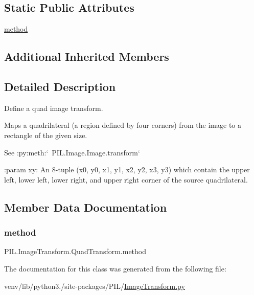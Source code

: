 \subsection*{Static Public Attributes}
\begin{DoxyCompactItemize}
\item 
\hyperlink{classPIL_1_1ImageTransform_1_1QuadTransform_aae86a5010e638667d2da9af44c393040}{method}
\end{DoxyCompactItemize}
\subsection*{Additional Inherited Members}


\subsection{Detailed Description}
\begin{DoxyVerb}Define a quad image transform.

Maps a quadrilateral (a region defined by four corners) from the image to a
rectangle of the given size.

See :py:meth:`~PIL.Image.Image.transform`

:param xy: An 8-tuple (x0, y0, x1, y1, x2, y2, x3, y3) which contain the
    upper left, lower left, lower right, and upper right corner of the
    source quadrilateral.
\end{DoxyVerb}
 

\subsection{Member Data Documentation}
\mbox{\label{classPIL_1_1ImageTransform_1_1QuadTransform_aae86a5010e638667d2da9af44c393040}} 
\subsubsection{\texorpdfstring{method}{method}}
{\footnotesize\ttfamily P\+I\+L.\+Image\+Transform.\+Quad\+Transform.\+method\hspace{0.3cm}{\ttfamily [static]}}



The documentation for this class was generated from the following file\+:\begin{DoxyCompactItemize}
\item 
venv/lib/python3./site-\/packages/\+P\+I\+L/\hyperlink{ImageTransform_8py}{Image\+Transform.\+py}\end{DoxyCompactItemize}
